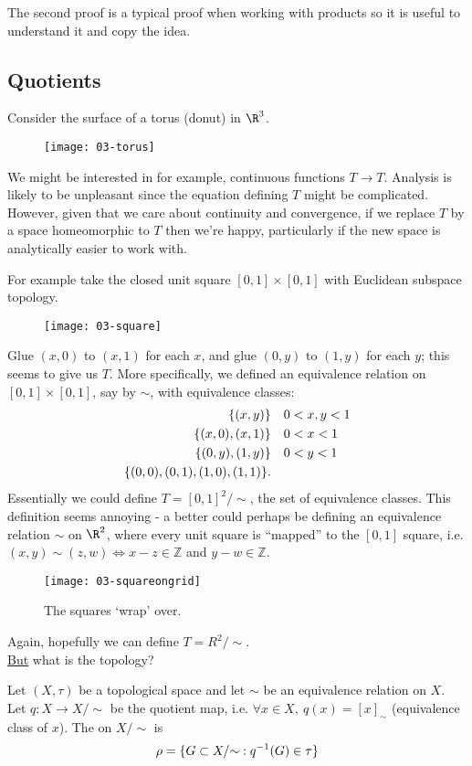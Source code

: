 \begin{remark}
    The second proof is a typical proof when working with products so it is useful to understand it and copy the idea.
\end{remark} 

\subsection{Quotients}
Consider the surface of a torus (donut) in $\R^3$. 
\begin{figure}[h] 
    \centering 
    \texttt{[image: 03-torus]} 
\end{figure}
We might be interested in for example, continuous functions $T\to T$. Analysis is likely to be unpleasant since the equation defining $T$ might be complicated. However, given that we care about continuity and convergence, if we replace $T$ by a space homeomorphic to $T$ then we're happy, particularly if the new space is analytically easier to work with.

For example take the closed unit square $[0,1]\times[0,1]$ with Euclidean subspace topology. 
\begin{figure}[h] 
    \centering 
    \texttt{[image: 03-square]} 
\end{figure}
Glue $(x,0)$ to $(x,1)$ for each $x$, and glue $(0,y)$ to $(1,y)$ for each $y$; this seems to give us $T$. More specifically, we defined an equivalence relation on $[0,1]\times[0,1]$, say by $\sim$, with equivalence classes: 
\begin{align*}
    \{(x,y)\} & \quad 0<x,y<1\\
    \{(x,0),(x,1)\} & \quad 0<x<1\\
    \{(0,y),(1,y)\} & \quad 0<y<1\\
    \{(0,0), (0,1), (1,0), (1,1)\}.
\end{align*}
Essentially we could define $T = [0,1]^2 / {\sim}$, the set of equivalence classes.
This definition seems annoying - a better could perhaps be defining an equivalence relation $\sim$ on $\R^2$, where every unit square is ``mapped'' to the $[0,1]$ square, i.e. $(x,y)\sim(z,w) \Leftrightarrow x-z\in \mathbb{Z}$ and $y-w\in \mathbb{Z}$.
\begin{figure}[h] 
    \centering 
    \texttt{[image: 03-squareongrid]} 
    \caption{The squares `wrap' over.}
\end{figure}
Again, hopefully we can define $T = R^2/ {\sim}$. \\
\underline{But} what is the topology?
\begin{definition}
    Let $(X,\tau)$ be a topological space and let $\sim$ be an equivalence relation on $X$. Let $q: X\to X/ {\sim}$ be the quotient map, i.e. $\forall x \in X,\ q(x) = [x]_\sim$ (equivalence class of $x$).
    The  on $X/ {\sim}$ is
    \begin{align*}
        \rho = \{G\subset X/ {\sim} : q^{-1}(G)\in \tau\}
    \end{align*} 
\end{definition}

